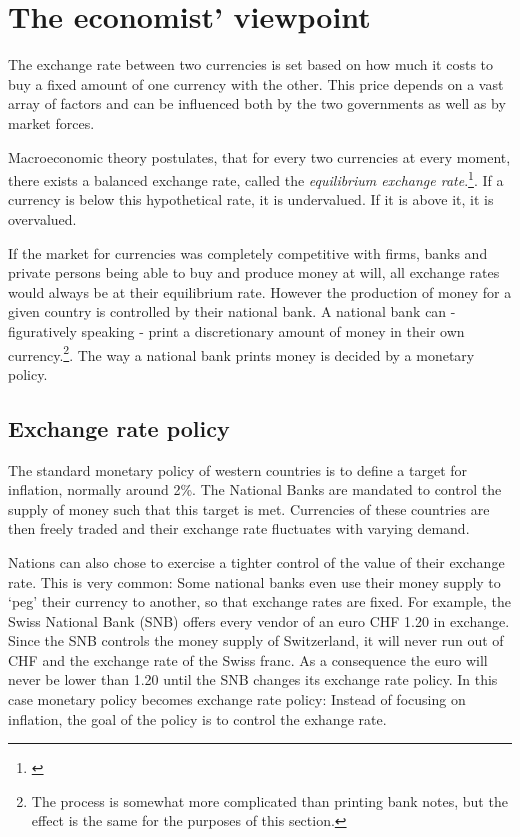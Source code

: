 \section{The economist' viewpoint}

The exchange rate between two currencies is set based on how much it 
costs to buy a fixed amount of one currency with the other. This price 
depends on a vast array of factors and can be influenced both by the two 
governments as well as by market forces.  

Macroeconomic theory postulates, that for every two currencies at every 
moment, there exists a balanced exchange rate, called the 
\emph{equilibrium exchange rate}.\footnote{\cite[p.  ?]{Krugman}}. If a 
currency is below this hypothetical rate, it is undervalued. If it is 
above it, it is overvalued.

If the market for currencies was completely competitive with firms, 
banks and private persons being able to buy and produce money at will, 
all exchange rates would always be at their equilibrium rate. However 
the production of money for a given country is controlled by their 
national bank. A national bank can - figuratively speaking - print a 
discretionary amount of money in their own currency.\footnote{The 
process is somewhat more complicated than printing bank notes, but the 
effect is the same for the purposes of this section.}. The way a 
national bank prints money is decided by a monetary policy. 

\subsection{Exchange rate policy}


The standard monetary policy of western countries is to define a target 
for inflation, normally around 2\%. The National Banks are mandated to 
control the supply of money such that this target is met. Currencies of 
these countries are then freely traded and their exchange rate 
fluctuates with varying demand. 

Nations can also chose to exercise a tighter control of the value of 
their exchange rate.  This is very common: Some national banks even use 
their money supply to `peg' their currency to another, so that exchange 
rates are fixed.  For example, the Swiss National Bank (SNB) offers 
every vendor of an euro CHF 1.20 in exchange.  Since the SNB controls 
the money supply of Switzerland, it will never run out of CHF and the 
exchange rate of the Swiss franc. As a consequence the euro will never 
be lower than 1.20 until the SNB changes its exchange rate policy. In 
this case monetary policy becomes exchange rate policy: Instead of 
focusing on inflation, the goal of the policy is to control the exhange 
rate.

